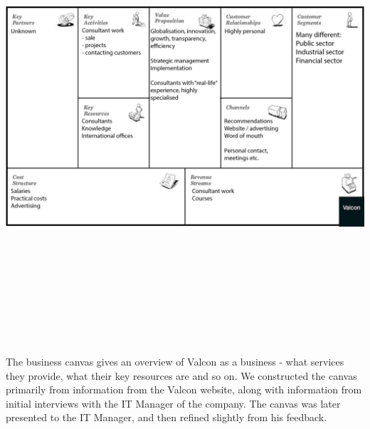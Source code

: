 \label{app:canvas}

\includegraphics[angle=90,height=475pt]{inline/business-model-canvas.png}

The business canvas gives an overview of Valcon as a business - what services they provide, what their key resources are and so on.
We constructed the canvas primarily from information from the Valcon website, along with information from initial interviews with the IT Manager of the company.
The canvas was later presented to the IT Manager, and then refined slightly from his feedback.